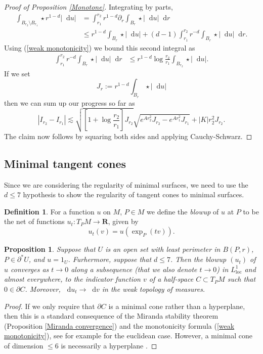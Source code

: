 \documentclass[final,12pt, leqno]{brownthesis}
\newcommand{\RR}{\mathbf{R}}
\newcommand*\dif{\mathop{}\!\mathrm{d}}
\newcommand{\dfn}[1]{\emph{#1}\index{#1}}
\newcommand{\loc}{\mathrm{loc}}
\newtheorem{proposition}[theorem]{Proposition}
\theoremstyle{definition}
\newtheorem{definition}[theorem]{Definition}
\numberwithin{equation}{section}
\begin{document}
\begin{proof}[Proof of Proposition \ref{Monotone}]
Integrating by parts,
\begin{align*}
\int_{B_{r_2} \setminus B_{r_1}} \star r^{1 - d} |\dif u| &= \int_{r_1}^{r_2} r^{1 - d} \partial_r \int_{B_r} \star |\dif u| \dif r \\
&\leq r^{1 - d} \int_{B_r} \star |\dif u| + (d - 1) \int_{r_1}^{r_2} r^{-d} \int_{B_r} \star |\dif u| \dif r.
\end{align*}
Using (\ref{weak monotonicity}) we bound this second integral as
\begin{align*}
\int_{r_1}^{r_2} r^{-d} \int_{B_r} \star |\dif u| \dif r &\leq r^{1 - d} \log \frac{r_2}{r_1} \int_{B_{r_2}} \star |\dif u|.
\end{align*}
If we set
$$J_r := r^{1 - d} \int_{B_r} \star |\dif u|$$
then we can sum up our progress so far as
$$|I_{r_2} - I_{r_1}| \lesssim \sqrt{\left[1 + \log \frac{r_2}{r_1}\right] J_{r_2}} \sqrt{e^{Ar_2^2} J_{r_2} - e^{Ar_1^2} J_{r_1}} + |K|r_2^2 J_{r_2}.$$
The claim now follows by squaring both sides and applying Cauchy-Schwarz.
\end{proof}

\subsection{Minimal tangent cones}
Since we are considering the regularity of minimal surfaces, we need to use the $d \leq 7$ hypothesis to show the regularity of tangent cones to minimal surfaces.

\begin{definition}
    For a function $u$ on $M$, $P \in M$ we define the \dfn{blowup} of $u$ at $P$ to be the net of functions $u_t: T_PM \to \RR$, given by
    $$u_t(v) = u\left(\exp_P(tv)\right).$$
\end{definition}

\begin{proposition}\label{blowup theorem}
Suppose that $U$ is an open set with least perimeter in $B(P, r)$, $P \in \partial^* U$, and $u = 1_U$.
Furhermore, suppose that $d \leq 7$.
Then the blowup $(u_t)$ of $u$ converges as $t \to 0$ along a subsequence (that we also denote $t \to 0$) in $L^1_\loc$ and almost everywhere, to the indicator function $v$ of a half-space $C \subset T_PM$ such that $0 \in \partial C$.
Moreover, $\dif u_t \to \dif v$ in the weak topology of measures.
\end{proposition}
\begin{proof}
If we only require that $\partial C$ is a minimal cone rather than a hyperplane, then this is a standard consequence of the Miranda stability theorem (Proposition \ref{Miranda convergence}) and the monotonicity formula (\ref{weak monotonicity}), see for example \cite[Theorem 9.3]{Giusti77} for the euclidean case.
However, a minimal cone of dimension $\leq 6$ is necessarily a hyperplane \cite[Theorem 9.10 and Theorem 10.10]{Giusti77}.
\end{proof}
\end{document}
